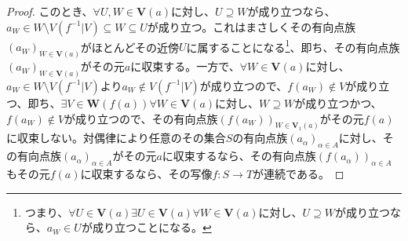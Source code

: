 \documentclass[dvipdfmx]{jsarticle}
\begin{document}
\begin{proof}
このとき、$\forall U,W \in \mathbf{V}(a)$に対し、$U \supseteq W$が成り立つなら、$a_{W} \in W \setminus V\left( f^{- 1}|V \right) \subseteq W \subseteq U$が成り立つ。これはまさしくその有向点族$\left( a_{W} \right)_{W \in \mathbf{V}(a)}$がほとんどその近傍$U$に属することになる\footnote{つまり、$\forall U \in \mathbf{V}(a)\exists U \in \mathbf{V}(a)\forall W \in \mathbf{V}(a)$に対し、$U \supseteq W$が成り立つなら、$a_{W} \in U$が成り立つことになる。}、即ち、その有向点族$\left( a_{W} \right)_{W \in \mathbf{V}(a)}$がその元$a$に収束する。一方で、$\forall W \in \mathbf{V}(a)$に対し、$a_{W} \in W \setminus V\left( f^{- 1}|V \right)$より$a_{W} \notin V\left( f^{- 1}|V \right)$が成り立つので、$f\left( a_{W} \right) \notin V$が成り立つ、即ち、$\exists V \in \mathbf{W}\left( f(a) \right)\forall W \in \mathbf{V}(a)$に対し、$W \supseteq W$が成り立つかつ、$f\left( a_{W} \right) \notin V$が成り立つので、その有向点族$\left( f\left( a_{W} \right) \right)_{W \in \mathbf{V}_{1}(a)}$がその元$f(a)$に収束しない。対偶律により任意のその集合$S$の有向点族$\left( a_{\alpha} \right)_{\alpha \in A}$に対し、その有向点族$\left( a_{\alpha} \right)_{\alpha \in A}$がその元$a$に収束するなら、その有向点族$\left( f\left( a_{\alpha} \right) \right)_{\alpha \in A}$もその元$f(a)$に収束するなら、その写像$f:S \rightarrow T$が連続である。
\end{proof}
\end{document}
